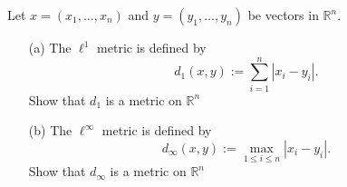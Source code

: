 \begin{problem}[20 pts]  
Let $x=(x_1,\dots,x_n)$ and $y=(y_1,\dots,y_n)$ be vectors in $\mathbb{R}^n$.

\vfill
\bigskip

\begin{enumerate}
\item[(a)] The $\ell^1$ metric is defined by
\[
d_1(x,y) := \sum_{i=1}^n |x_i - y_i|.
\]
Show that $d_1$ is a metric on $\mathbb{R}^n$


\item[(b)] The $\ell^\infty$ metric is defined by
\[
d_\infty(x,y) := \max_{1 \leq i \leq n} |x_i - y_i|.
\]
Show that $d_{\infty}$ is a metric on $\mathbb{R}^n$

\end{enumerate}
\end{problem}
